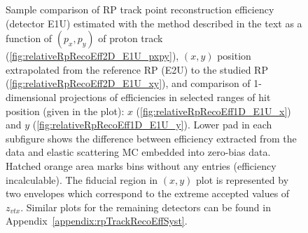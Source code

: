 \begin{figure}[h]
{\begin{subfigure}[b]{\linewidth}
		\end{subfigure}
	}
	\caption[Coparison of estimated RP track point reconstruction efficiency in 2D and 1D (detector E1U).]%
	{Sample comparison of RP track point reconstruction efficiency (detector E1U) estimated with the method described in the text as a function of $(p_{x},p_{y})$ of proton track (\ref{fig:relativeRpRecoEff2D_E1U_pxpy}), $(x,y)$ position extrapolated from the reference RP (E2U) to the studied RP (\ref{fig:relativeRpRecoEff2D_E1U_xy}), and comparison of 1-dimensional projections of efficiencies in selected ranges of hit position (given in the plot): $x$ (\ref{fig:relativeRpRecoEff1D_E1U_x}) and $y$ (\ref{fig:relativeRpRecoEff1D_E1U_y}). Lower pad in each subfigure shows the difference between efficiency extracted from the data and elastic scattering MC embedded into zero-bias data. Hatched orange area marks bins without any entries (efficiency incalculable). The fiducial region in $(x,y)$ plot is represented by two envelopes which correspond to the extreme accepted values of $z_{vtx}$. Similar plots for the remaining detectors can be found in Appendix~\ref{appendix:rpTrackRecoEffSyst}.%
	}\label{fig:relativeRpRecoEff_E1U}
\end{figure}



